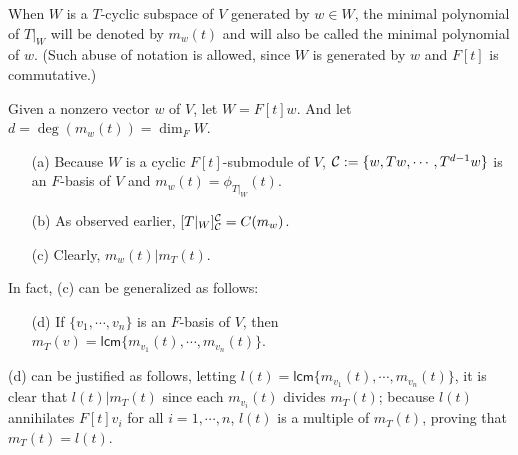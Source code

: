 \begin{nota}
    When $W$ is a $T$-cyclic subspace of $V$ generated by $w\in W$, the minimal polynomial of $T|_W$ will be denoted by $m_w(t)$ and will also be called the minimal polynomial of $w$.
    (Such abuse of notation is allowed, since $W$ is generated by $w$ and $F[t]$ is commutative.)
\end{nota}
\begin{obs}
    Given a nonzero vector $w$ of $V$, let $W=F[t]w$.
    And let $d=\deg(m_w(t))=\dim_F W$.
    \begin{enumerate}
        \item[(a)]
        {
            Because $W$ is a cyclic $F[t]$-submodule of $V$, ${\mathcal{C}}:=\{w, Tw, \cdots, T^{d-1}w\}$ is an $F$-basis of $V$ and $m_w(t)=\phi_{T|_W}(t)$.
        }
        \item[(b)]
        {
            As observed earlier, $[T|_W]^{\mathcal{C}}_{\mathcal{C}}=C(m_w)$.
        }
        \item[(c)]
        {
            Clearly, $m_w(t)|m_T(t)$.
        }
    \end{enumerate}
    In fact, (c) can be generalized as follows:
    \begin{enumerate}
        \item[(d)]
        {
            If $\{v_1, \cdots, v_n\}$ is an $F$-basis of $V$, then $m_T(v)=\textsf{lcm}\{m_{v_1}(t), \cdots, m_{v_n}(t)\}$.
        }
    \end{enumerate}
    (d) can be justified as follows, letting $l(t)=\textsf{lcm}\{m_{v_1}(t), \cdots, m_{v_n}(t)\}$, it is clear that $l(t)|m_T(t)$ since each $m_{v_i}(t)$ divides $m_T(t)$; because $l(t)$ annihilates $F[t]v_i$ for all $i=1, \cdots, n$, $l(t)$ is a multiple of $m_T(t)$, proving that $m_T(t)=l(t)$.

\end{obs}

